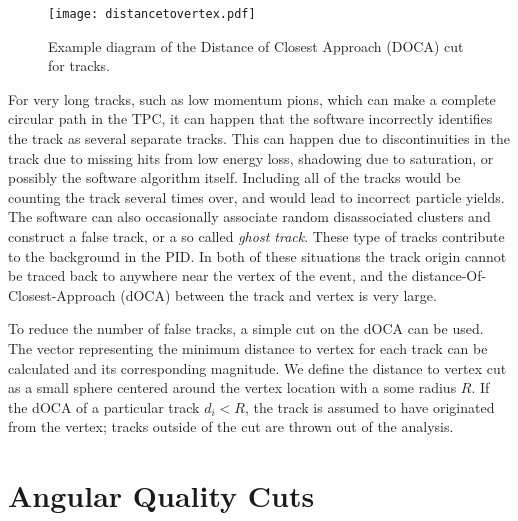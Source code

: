\begin{figure}[!htb]
\centering
\texttt{[image: distancetovertex.pdf]}
\label{fig:poca}
\caption{Example diagram of the Distance of Closest Approach (DOCA) cut for tracks.}
\end{figure}

For very long tracks, such as low momentum pions, which can make a complete circular path in the TPC, it can happen that the software incorrectly identifies the track as several separate tracks. This can happen due to discontinuities in the track due to missing hits from low energy loss, shadowing due to saturation, or possibly the software algorithm itself. Including all of the tracks would be counting the track several times over, and would lead to incorrect particle yields. The software can also occasionally associate random disassociated clusters and construct a false track, or a so called \emph{ghost track}. These type of tracks contribute to the background in the PID. In both of these situations the track origin cannot be traced back to anywhere near the vertex of the event, and the distance-Of-Closest-Approach (dOCA) between the track and vertex is very large. 

To reduce the number of false tracks, a simple cut on the dOCA can be used. The vector representing the minimum distance to vertex for each track can be calculated and its corresponding magnitude. We define the distance to vertex cut as a small sphere centered around the vertex location with a some radius $R$. If the dOCA of a particular track $d_i < R$, the track is assumed to have originated from the vertex; tracks outside of the cut are thrown out of the analysis. 


\section{Angular Quality Cuts}

